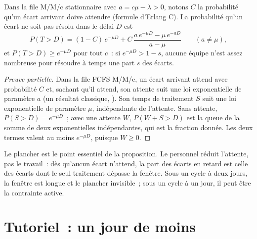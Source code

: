 \begin{proposition}\label{prop:fm:operations:late}
Dans la file M/M/c stationnaire avec $a=c\mu-\lambda>0$, notons $C$ la probabilité qu'un écart arrivant doive attendre (formule d'Erlang C). La
probabilité qu'un écart ne soit pas résolu dans le délai $D$ est
\[
P(T>D)=(1-C)\,e^{-\mu D}+C\,\frac{a\,e^{-\mu D}-\mu\,e^{-aD}}{a-\mu}\qquad(a\neq\mu),
\]
et $P(T>D)\ge e^{-\mu D}$ pour tout $c$~: si $e^{-\mu D}>1-s$, aucune équipe n'est assez nombreuse pour résoudre à temps une part $s$ des écarts.
\end{proposition}

\begin{proof}[Preuve partielle]
Dans la file FCFS M/M/c, un écart arrivant attend avec probabilité $C$ et, sachant qu'il attend, son attente suit une loi exponentielle de paramètre $a$ (un
résultat classique, \admitted). Son temps de traitement $S$ suit une loi exponentielle de paramètre $\mu$, indépendante de l'attente. Sans attente, $P(S>D)=e^{-\mu D}$~; avec une attente $W$,
$P(W+S>D)$ est la queue de la somme de deux exponentielles indépendantes, qui est la fraction donnée. Les deux termes valent au moins $e^{-\mu D}$, puisque
$W\ge0$.
\end{proof}

\label{lst:fm:operations:late}

Le plancher est le point essentiel de la proposition. Le personnel réduit l'attente, pas le travail~: dès qu'aucun écart n'attend, la part des écarts en retard est celle des écarts dont
le seul traitement dépasse la fenêtre. Sous un cycle à deux jours, la fenêtre est longue et le plancher invisible~; sous un cycle à un jour, il peut être la
contrainte active.

\section{Tutoriel~: un jour de moins}\label{tut:fm:operations:tut}

